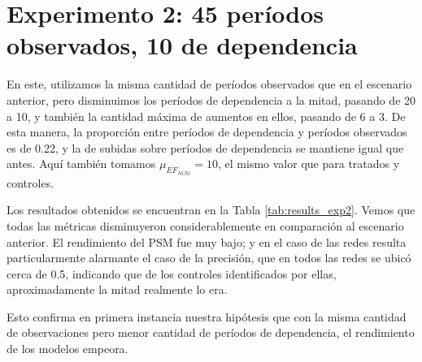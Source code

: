 \documentclass[../../main.tex]{subfiles}
\begin{document}
\section{Experimento 2: 45 períodos observados, 10 de dependencia} \label{sec:exp2} 
En este, utilizamos la misma cantidad de períodos observados que en el escenario anterior,
pero disminuimos los períodos de dependencia a la mitad, pasando de 20 a 10, y también la
cantidad máxima de aumentos en ellos, pasando de 6 a 3. De esta manera, la proporción
entre períodos de dependencia y períodos observados es de 0.22, y la de subidas sobre
períodos de dependencia se mantiene igual que antes. Aquí también tomamos
\(\mu_{{EF}_{NiNi}} = 10\), el mismo valor que para tratados y controles.


Los resultados obtenidos se encuentran en la Tabla \ref{tab:results_exp2}. Vemos que todas
las métricas disminuyeron considerablemente en comparación al escenario anterior. El
rendimiento del PSM fue muy bajo; y en el caso de las redes resulta particularmente
alarmante el caso de la precisión, que en todos las redes se ubicó cerca de 0.5, indicando
que de los controles identificados por ellas, aproximadamente la mitad realmente lo era.

Esto confirma en primera instancia nuestra hipótesis que con la misma cantidad de
observaciones pero menor cantidad de períodos de dependencia, el rendimiento de los
modelos empeora.
\end{document}
